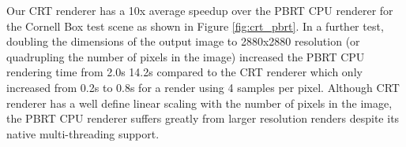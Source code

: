 \documentclass[../main.tex]{subfiles}
\begin{document}
Our CRT renderer has a 10x average speedup over the PBRT CPU renderer
for the Cornell Box test scene as shown in Figure \ref{fig:crt_pbrt}.
In a further test, doubling the dimensions of the output image to
2880x2880 resolution (or quadrupling the 
number of pixels in the image) increased the PBRT CPU rendering time from 2.0s 
14.2s compared to the CRT renderer which only increased from 0.2s to 0.8s for
a render using 4 samples per pixel. Although CRT renderer has a well define linear
scaling with the number of pixels in the image, the PBRT CPU renderer suffers greatly
from larger resolution renders despite its native multi-threading support.

\ifSubfilesClassLoaded{%
    \nocite{*}
    \twocolumn
}{}
\end{document}
